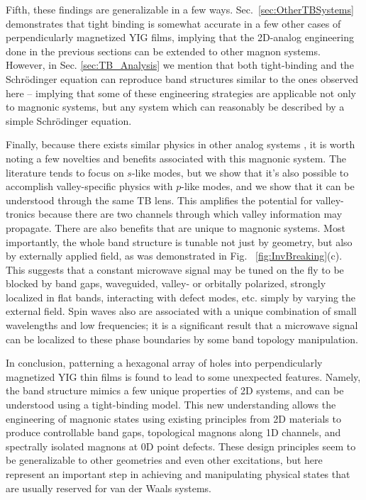 \documentclass[aps,prx,twocolumn,superscriptaddress,floatfix]{revtex4-2}
\begin{document}
Fifth, these findings are generalizable in a few ways. Sec.~\ref{sec:OtherTBSystems} demonstrates that tight binding is somewhat accurate in a few other cases of perpendicularly magnetized YIG films, implying that the 2D-analog engineering done in the previous sections can be extended to other magnon systems. However, in Sec. \ref{sec:TB_Analysis} we mention that both tight-binding and the Schr{\"o}dinger equation can reproduce band structures similar to the ones observed here -- implying that some of these engineering strategies are applicable not only to magnonic systems, but any system which can reasonably be described by a simple Schr{\"o}dinger equation.

Finally, because there exists similar physics in other analog systems \cite{milicevic_type-iii_2019, gao_visualization_2024, wu_p_xy-orbital_2008, polini_artificial_2013, mangussi_multi-orbital_2020, ding_experimental_2019}, it is worth noting a few novelties and benefits associated with this magnonic system. The literature tends to focus on $s$-like modes, but we show that it's also possible to accomplish valley-specific physics with $p$-like modes, and we show that it can be understood through the same TB lens. This amplifies the potential for valley-tronics because there are two channels through which valley information may propagate. There are also benefits that are unique to magnonic systems. Most importantly, the whole band structure is tunable not just by geometry, but also by externally applied field, as was demonstrated in Fig. ~\ref{fig:InvBreaking}(c). This suggests that a constant microwave signal may be tuned on the fly to be blocked by band gaps, waveguided, valley- or orbitally polarized, strongly localized in flat bands, interacting with defect modes, etc. simply by varying the external field. Spin waves also are associated with a unique combination of small wavelengths and low frequencies; it is a significant result that a microwave signal can be localized to these phase boundaries by some band topology manipulation.

In conclusion, patterning a hexagonal array of holes into perpendicularly magnetized YIG thin films is found to lead to some unexpected features. Namely, the band structure mimics a few unique properties of 2D systems, and can be understood using a tight-binding model. This new understanding allows the engineering of magnonic states using existing principles from 2D materials to produce controllable band gaps, topological magnons along 1D channels, and spectrally isolated magnons at 0D point defects. These design principles seem to be generalizable to other geometries and even other excitations, but here represent an important step in achieving and manipulating physical states that are usually reserved for van der Waals systems.
\end{document}
